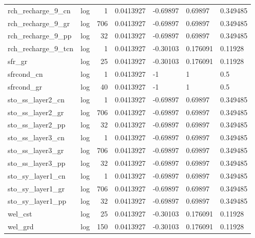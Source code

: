 \documentclass{article}
\begin{document}
\begin{center}
\begin{landscape}
\begin{longtable}{llrllll}
  rch\_recharge\_9\_cn &       log &      1 &      0.0413927 &       -0.69897 &        0.69897 &           0.349485 \\
  rch\_recharge\_9\_gr &       log &    706 &      0.0413927 &       -0.69897 &        0.69897 &           0.349485 \\
  rch\_recharge\_9\_pp &       log &     32 &      0.0413927 &       -0.69897 &        0.69897 &           0.349485 \\
 rch\_recharge\_9\_tcn &       log &      1 &      0.0413927 &       -0.30103 &       0.176091 &            0.11928 \\
             sfr\_gr &       log &     25 &      0.0413927 &       -0.30103 &       0.176091 &            0.11928 \\
         sfrcond\_cn &       log &      1 &      0.0413927 &             -1 &              1 &                0.5 \\
         sfrcond\_gr &       log &     40 &      0.0413927 &             -1 &              1 &                0.5 \\
   sto\_ss\_layer2\_cn &       log &      1 &      0.0413927 &       -0.69897 &        0.69897 &           0.349485 \\
   sto\_ss\_layer2\_gr &       log &    706 &      0.0413927 &       -0.69897 &        0.69897 &           0.349485 \\
   sto\_ss\_layer2\_pp &       log &     32 &      0.0413927 &       -0.69897 &        0.69897 &           0.349485 \\
   sto\_ss\_layer3\_cn &       log &      1 &      0.0413927 &       -0.69897 &        0.69897 &           0.349485 \\
   sto\_ss\_layer3\_gr &       log &    706 &      0.0413927 &       -0.69897 &        0.69897 &           0.349485 \\
   sto\_ss\_layer3\_pp &       log &     32 &      0.0413927 &       -0.69897 &        0.69897 &           0.349485 \\
   sto\_sy\_layer1\_cn &       log &      1 &      0.0413927 &       -0.69897 &        0.69897 &           0.349485 \\
   sto\_sy\_layer1\_gr &       log &    706 &      0.0413927 &       -0.69897 &        0.69897 &           0.349485 \\
   sto\_sy\_layer1\_pp &       log &     32 &      0.0413927 &       -0.69897 &        0.69897 &           0.349485 \\
            wel\_cst &       log &     25 &      0.0413927 &       -0.30103 &       0.176091 &            0.11928 \\
            wel\_grd &       log &    150 &      0.0413927 &       -0.30103 &       0.176091 &            0.11928 \\
\end{longtable}
\end{landscape}
\end{center}
\end{document}
